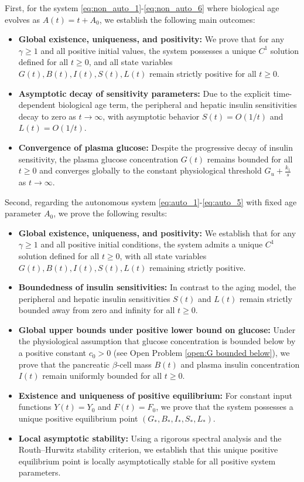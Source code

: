 \documentclass[pdflatex,sn-mathphys-num]{sn-jnl}
\theoremstyle{thmstyleone}
\theoremstyle{thmstyletwo}
\theoremstyle{thmstylethree}
\begin{document}
First, for the  system \eqref{eq:non_auto_1}-\eqref{eq:non_auto_6} 
where biological age 
evolves as $A(t) = t + A_0$, we establish the following main outcomes: 
\begin{itemize}
    \item \textbf{Global existence, uniqueness, and positivity:} We prove that for any $\gamma \ge 1$ and all 
    positive initial values, the system possesses a unique $C^1$ solution defined for all $t \ge 0$, and all 
    state variables $G(t), B(t), I(t), S(t), L(t)$ remain strictly positive for all $t \ge 0$.
    \item \textbf{Asymptotic decay of sensitivity parameters:} Due to the explicit time-dependent biological 
    age term, the peripheral and hepatic insulin sensitivities decay to zero as $t \to \infty$, 
    with asymptotic behavior $S(t) = O(1/t)$ and $L(t) = O(1/t)$. 
    \item \textbf{Convergence of plasma glucose:} Despite the progressive decay of insulin sensitivity, the 
    plasma glucose concentration $G(t)$ remains bounded for all $t \ge 0$ and converges globally to the constant 
    physiological threshold $G_u + \frac{k_1}{s}$ as $t \to \infty$. 
\end{itemize}

Second, regarding the autonomous system \eqref{eq:auto_1}-\eqref{eq:auto_5}  
with fixed age parameter $A_0$, we 
prove the following results: 
\begin{itemize}
    \item \textbf{Global existence, uniqueness, and positivity:} We establish that for any $\gamma \ge 1$ and 
    all positive initial conditions, the system admits a unique $C^1$ solution defined for all $t \ge 0$, with 
    all state variables $G(t), B(t), I(t), S(t), L(t)$ remaining strictly positive.  
    \item \textbf{Boundedness of insulin sensitivities:} In contrast to the aging model, the peripheral and 
    hepatic insulin sensitivities $S(t)$ and $L(t)$ remain strictly bounded away from zero and infinity for all 
    $t \ge 0$.  
    \item \textbf{Global upper bounds under positive lower bound on glucose:} Under the physiological assumption 
    that glucose concentration is bounded below by a positive constant $c_0 > 0$ 
    (see Open Problem \ref{open:G bounded below}), 
    we prove that the pancreatic 
    $\beta$-cell mass $B(t)$ and plasma insulin concentration $I(t)$ remain uniformly bounded for all $t \ge 0$. 
    \item \textbf{Existence and uniqueness of positive equilibrium:} For constant input functions $Y(t) = Y_0$ 
    and $F(t) = F_0$, we prove that the system possesses a unique positive equilibrium point $(G_*, B_*, I_*, 
    S_*, L_*)$.  
    \item \textbf{Local asymptotic stability:} 
    Using a rigorous spectral analysis and the Routh–Hurwitz 
    stability criterion, we establish that this unique positive equilibrium point 
    is locally asymptotically 
    stable for all positive system parameters.  
\end{itemize}
\end{document}
